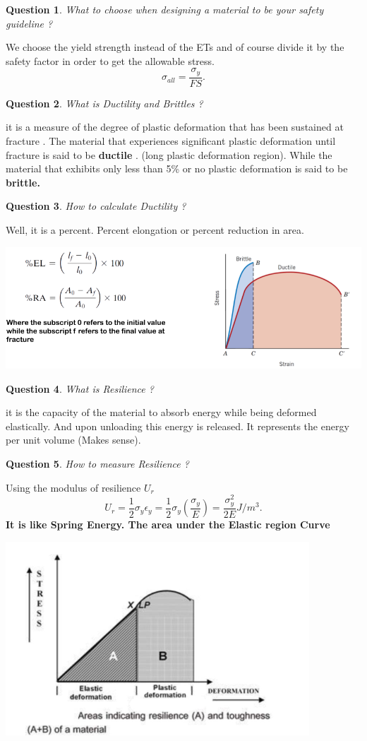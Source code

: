 \documentclass[13]{article}
\newtheorem{exer}{Question}
\begin{document}
\begin{exer}
What to choose when designing a material to be your safety guideline ?
\end{exer}
We choose the yield strength instead of the ETs and of course divide it by the safety factor in order to get the allowable stress.
\[
	\sigma_{all} = \frac{\sigma_y}{FS} 
.\] 
\begin{exer}
What is Ductility and Brittles ?
\end{exer}
it is a measure of the degree of plastic deformation that has been sustained at fracture . The material that experiences significant plastic deformation until fracture is said to be \textbf{ductile} . (long plastic deformation region).
While the material that exhibits only less than 5\% or no plastic deformation is said to be \textbf{brittle. } 
\begin{exer}
How to calculate Ductility ?
\end{exer}
Well, it is a percent. Percent elongation or percent reduction in area.
\begin{center}
\includegraphics[scale=0.5]{figures/5.png}
\end{center}
\begin{exer}
What is Resilience ?
\end{exer}
it is the capacity of the material to absorb energy while being deformed elastically. And upon unloading this energy is released. It represents the energy per unit volume (Makes sense).   
\begin{exer}
How to measure Resilience ?
\end{exer}
Using the modulus of resilience $U_r$
\[
	U_r = \frac{1}{2} \sigma_y \epsilon_y = \frac{1}{2} \sigma_y (\frac{\sigma_y}{E}) = \frac{\sigma_y^2}{2E} J/m^3 
.\]
\textbf{It is like Spring Energy. The area under the Elastic region Curve
} 
\begin{center}
\includegraphics[scale=0.5]{figures/6.png}
\end{center}
\end{document}
